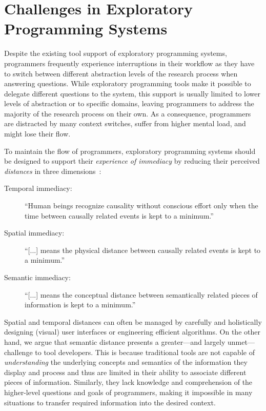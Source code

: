 
\section{Challenges in Exploratory Programming Systems}
\label{sec:background/challenges}

Despite the existing tool support of exploratory programming systems, programmers frequently experience interruptions in their workflow as they have to switch between different abstraction levels of the research process when answering questions.
While exploratory programming tools make it possible to delegate different questions to the system, this support is usually limited to lower levels of abstraction or to specific domains, leaving programmers to address the majority of the research process on their own.
As a consequence, programmers are distracted by many context switches, suffer from higher mental load, and might lose their flow.

To maintain the flow of programmers, exploratory programming systems should be designed to support their \emph{experience of immediacy} by reducing their perceived \emph{distances} in three dimensions~\cite{ungar1997debugging}:

\begin{description}
	\item[Temporal immediacy:] ``Human beings recognize causality without conscious effort only when the time between causally related events is kept to a minimum.''
	\item[Spatial immediacy:] ``[...] means the physical distance between causally related events is kept to a minimum.''
	\item[Semantic immediacy:] ``[...] means the conceptual distance between semantically related pieces of information is kept to a minimum.''
\end{description}

\noindent
Spatial and temporal distances can often be managed by carefully and holistically designing (visual) user interfaces or engineering efficient algorithms.
On the other hand, we argue that semantic distance presents a greater---and largely unmet---challenge to tool developers.
This is because traditional tools are not capable of \emph{understanding} the underlying concepts and semantics of the information they display and process and thus are limited in their ability to associate different pieces of information.
Similarly, they lack knowledge and comprehension of the higher-level questions and goals of programmers, making it impossible in many situations to transfer required information into the desired context.

